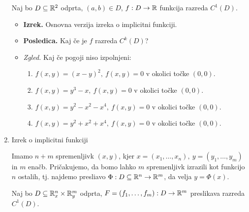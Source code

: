 \begin{enumerate}
    Naj bo $D \subseteq \mathbb{R}^2$ odprta, $(a, b) \in D$, $f: D \to \mathbb{R}$ funkcija razreda $C^1(D)$.
    \begin{itemize}
        \item \colorbox{blue!30}{\textbf{Izrek.}} Osnovna verzija izreka o implicitni funkciji.
        \item \colorbox{orange!30}{\textbf{Posledica.}} Kaj če je $f$ razreda $C^k(D)$?
        \item \colorbox{yellow!30}{\emph{Zgled.}} Kaj če pogoji niso izpolnjeni:
        \begin{enumerate}
            \item $f(x,y) = (x-y)^2, \ f(x,y) = 0$ v okolici točke $(0,0)$.
            \item $f(x,y) = y^3-x, \ f(x,y) = 0$ v okolici točke $(0,0)$.
            \item $f(x,y) = y^2-x^2-x^4, \ f(x,y) = 0$ v okolici točke $(0,0)$.
            \item $f(x,y) = y^2+x^2+x^4,  \ f(x,y) = 0$ v okolici točke $(0,0)$.
        \end{enumerate}
    \end{itemize}

    \item Izrek o implicitni funkciji
    
    Imamo $n+m$ spremenljivk $(x,y)$, kjer $x = (x_1, \ldots, x_n), \ y = (y_1, \ldots, y_m)$ in $m$ enačb. Pričakujemo, da bomo lahko $m$ spremenljivk izrazili kot funkcijo $n$ ostalih, tj. najdemo presliavo $\Phi: D \subseteq \mathbb{R}^n \to \mathbb{R}^m$, da velja $y = \Phi(x)$.

    Naj bo $D \subseteq \mathbb{R}^n_x \times \mathbb{R}^m_y$ odprta, $F = (f_1, \ldots, f_m): D \to \mathbb{R}^m$ preslikava razreda $C^1(D)$.


\end{enumerate}
